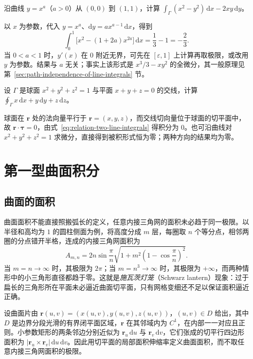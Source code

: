 \documentclass[UTF8,12pt,a4paper,fontset=fandol]{ctexbook}
\begin{document}
\begin{example}
\label{ex:second-line-integral-variable-path}
沿曲线 $y=x^a$（$a>0$）从 $(0,0)$ 到 $(1,1)$，计算 $\int_\Gamma(x^2-y^2)\,\mathrm dx-2xy\,\mathrm dy$。
\end{example}
\begin{solve}
以 $x$ 为参数，代入 $y=x^a$、$\mathrm dy=ax^{a-1}\,\mathrm dx$，得到
\[
    \int_0^1\bigl[x^2-(1+2a)x^{2a}\bigr]\,\mathrm dx
    =\frac13-1=-\frac23.
\]
当 $0<a<1$ 时，$y'(x)$ 在 $0$ 附近无界，可先在 $[\varepsilon,1]$ 上计算再取极限，或改用 $y$ 为参数。结果与 $a$ 无关；事实上该形式是 $x^3/3-xy^2$ 的全微分，其一般原理见第~\ref{sec:path-independence-of-line-integrals} 节。
\end{solve}

\begin{example}
\label{ex:second-line-integral-sphere-circle}
设 $\Gamma$ 是球面 $x^2+y^2+z^2=1$ 与平面 $x+y+z=0$ 的交线，计算 $\oint_\Gamma x\,\mathrm dx+y\,\mathrm dy+z\,\mathrm dz$。
\end{example}
\begin{solve}
球面在 $\boldsymbol r$ 处的法向量平行于 $\boldsymbol r=(x,y,z)$，而交线切向量位于球面的切平面中，故 $\boldsymbol r\cdot\boldsymbol\tau=0$，由式~\eqref{eq:relation-two-line-integrals} 得积分为 $0$。也可沿曲线对 $x^2+y^2+z^2=1$ 求微分，直接得到被积形式恒为零；两种方向的结果均为零。
\end{solve}

\section{第一型曲面积分}
\label{sec:surface-integrals-of-the-first-kind}

\subsection{曲面的面积}
\label{subsec:surface-area}

曲面面积不能直接照搬弧长的定义，任意内接三角网的面积未必趋于同一极限。以半径和高均为 $1$ 的圆柱侧面为例，将高度分成 $m$ 层，每圈取 $n$ 个等分点，相邻两圈的分点错开半格，连成的内接三角网面积为
\[
    A_{m,n}=2n\sin\frac\pi n
    \sqrt{1+m^2\left(1-\cos\frac\pi n\right)^2}.
\]
当 $m=n\to\infty$ 时，其极限为 $2\pi$；当 $m=n^3\to\infty$ 时，其极限为 $+\infty$，而两种情形中的小三角形直径都趋于零。这就是\emph{施瓦茨灯笼}（Schwarz lantern）现象：过于扁长的三角形所在平面未必逼近曲面切平面，只有网格变细还不足以保证面积逼近正确。

设曲面片由 $\boldsymbol r(u,v)=(x(u,v),y(u,v),z(u,v))$，$(u,v)\in D$ 给出，其中 $D$ 是边界分段光滑的有界闭平面区域，$\boldsymbol r$ 在其邻域内为 $C^1$，在内部一一对应且正则。小参数矩形的两条邻边分别近似为 $\boldsymbol r_u\,\mathrm du$ 与 $\boldsymbol r_v\,\mathrm dv$，它们张成的切平行四边形面积为 $|\boldsymbol r_u\times\boldsymbol r_v|\,\mathrm du\,\mathrm dv$。因此用切平面的局部面积伸缩率定义曲面面积，而不取任意内接三角网面积的极限。
\end{document}
